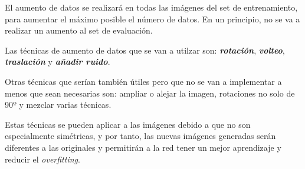 \documentclass{uc3mpracticas}
\begin{document}
  El aumento de datos se realizará en todas las imágenes del set de entrenamiento, para aumentar el máximo posible el número de datos. En un principio, no se va a realizar un aumento al set de evaluación.

  \vspace{2mm}

  Las técnicas de aumento de datos que se van a utilzar son: \textit{\textbf{rotación}}, \textit{\textbf{volteo}}, \textit{\textbf{traslación}} y \textit{\textbf{añadir ruido}}.

  \vspace{3mm}

  Otras técnicas que serían también útiles pero que no se van a implementar a menos que sean necesarias son: ampliar o alejar la imagen, rotaciones no solo de 90º y mezclar varias técnicas.

  \vspace{2mm}

  Estas técnicas se pueden aplicar a las imágenes debido a que no son especialmente simétricas, y por tanto, las nuevas imágenes generadas serán diferentes a las originales y permitirán a la red tener un mejor aprendizaje y reducir el \textit{overfitting}.
\end{document}

